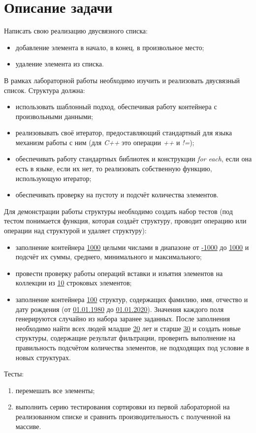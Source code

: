 \documentclass[12pt, a4paper]{report}
\begin{document}
	\section*{Описание задачи}
	\large
	Написать свою реализацию двусвязного списка:
	\begin{itemize}
		\item добавление элемента в начало, в конец, в произвольное место;
		\item удаление элемента из списка.
	\end{itemize}
	\par
	В рамках лабораторной работы необходимо изучить и реализовать двусвязный список. Структура должна:
	\begin{itemize}
		\item использовать шаблонный подход, обеспечивая работу контейнера с произвольными данными;
		\item реализовывать своё итератор, предоставляющий стандартный для языка механизм работы с ним (для \textit{C++} это операции \textit{++} и \textit{!=});
		\item обеспечивать работу стандартных библиотек и конструкции \textit{for each}, если она есть в языке, если их нет, то реализовать собственную функцию, использующую итератор;
		\item обеспечивать проверку на пустоту и подсчёт количества элементов.
	\end{itemize}
	\par
	Для демонстрации работы структуры необходимо создать набор тестов (под тестом понимается функция, которая создаёт структуру, проводит операцию или операции над структурой и удаляет структуру):
	\begin{itemize}
		\item заполнение контейнера \underline{1000} целыми числами в диапазоне от \underline{-1000} до \underline{1000} и подсчёт их суммы, среднего, минимального и максимального;
		\item провести проверку работы операций вставки и изъятия элементов на коллекции из \underline{10} строковых элементов;
		\item заполнение контейнера \underline{100} структур, содержащих фамилию, имя, отчество и дату рождения (от \underline{01.01.1980} до \underline{01.01.2020}). Значения каждого поля генерируются случайно из набора заранее заданных. После заполнения необходимо найти всех людей младше \underline{20} лет и старше \underline{30} и создать новые структуры, содержащие результат фильтрации, проверить выполнение на правильность подсчётом количества элементов, не подходящих под условие в новых структурах.
	\end{itemize}
	\par
	Тесты:
	\begin{enumerate}
		\item перемешать все элементы;
		\item выполнить серию тестирования сортировки из первой лабораторной на реализованном списке и сравнить производительность с полученной на массиве.
	\end{enumerate}
\end{document}
